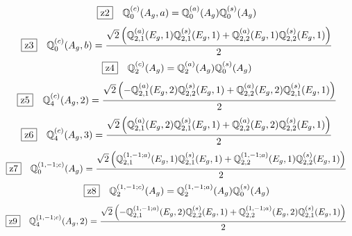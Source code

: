 \documentclass[fleqn,10pt,landscape]{jsarticle}
\begin{document}
\begin{dmath*}
\hspace*{3mm}\fbox{z2}\quad \mathbb{Q}_{0}^{(c)}(A_{g},a)=\mathbb{Q}_{0}^{(a)}(A_{g}) \mathbb{Q}_{0}^{(s)}(A_{g})
\end{dmath*}
\begin{dmath*}
\hspace*{3mm}\fbox{z3}\quad \mathbb{Q}_{0}^{(c)}(A_{g},b)=\frac{\sqrt{2} \left(\mathbb{Q}_{2,1}^{(a)}(E_{g},1) \mathbb{Q}_{2,1}^{(s)}(E_{g},1) + \mathbb{Q}_{2,2}^{(a)}(E_{g},1) \mathbb{Q}_{2,2}^{(s)}(E_{g},1)\right)}{2}
\end{dmath*}
\begin{dmath*}
\hspace*{3mm}\fbox{z4}\quad \mathbb{Q}_{2}^{(c)}(A_{g})=\mathbb{Q}_{2}^{(a)}(A_{g}) \mathbb{Q}_{0}^{(s)}(A_{g})
\end{dmath*}
\begin{dmath*}
\hspace*{3mm}\fbox{z5}\quad \mathbb{Q}_{4}^{(c)}(A_{g},2)=\frac{\sqrt{2} \left(- \mathbb{Q}_{2,1}^{(a)}(E_{g},2) \mathbb{Q}_{2,2}^{(s)}(E_{g},1) + \mathbb{Q}_{2,2}^{(a)}(E_{g},2) \mathbb{Q}_{2,1}^{(s)}(E_{g},1)\right)}{2}
\end{dmath*}
\begin{dmath*}
\hspace*{3mm}\fbox{z6}\quad \mathbb{Q}_{4}^{(c)}(A_{g},3)=\frac{\sqrt{2} \left(\mathbb{Q}_{2,1}^{(a)}(E_{g},2) \mathbb{Q}_{2,1}^{(s)}(E_{g},1) + \mathbb{Q}_{2,2}^{(a)}(E_{g},2) \mathbb{Q}_{2,2}^{(s)}(E_{g},1)\right)}{2}
\end{dmath*}
\begin{dmath*}
\hspace*{3mm}\fbox{z7}\quad \mathbb{Q}_{0}^{(1,-1;c)}(A_{g})=\frac{\sqrt{2} \left(\mathbb{Q}_{2,1}^{(1,-1;a)}(E_{g},1) \mathbb{Q}_{2,1}^{(s)}(E_{g},1) + \mathbb{Q}_{2,2}^{(1,-1;a)}(E_{g},1) \mathbb{Q}_{2,2}^{(s)}(E_{g},1)\right)}{2}
\end{dmath*}
\begin{dmath*}
\hspace*{3mm}\fbox{z8}\quad \mathbb{Q}_{2}^{(1,-1;c)}(A_{g})=\mathbb{Q}_{2}^{(1,-1;a)}(A_{g}) \mathbb{Q}_{0}^{(s)}(A_{g})
\end{dmath*}
\begin{dmath*}
\hspace*{3mm}\fbox{z9}\quad \mathbb{Q}_{4}^{(1,-1;c)}(A_{g},2)=\frac{\sqrt{2} \left(- \mathbb{Q}_{2,1}^{(1,-1;a)}(E_{g},2) \mathbb{Q}_{2,2}^{(s)}(E_{g},1) + \mathbb{Q}_{2,2}^{(1,-1;a)}(E_{g},2) \mathbb{Q}_{2,1}^{(s)}(E_{g},1)\right)}{2}
\end{dmath*}
\end{document}
